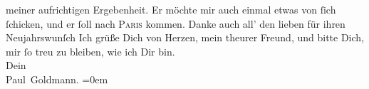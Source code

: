 \begin{ledgroupsized}[t]{13cm}
               meiner aufrichtigen Ergebenheit. Er möchte mir auch einmal etwas {\pb}von ſich ſchicken, und er ſoll nach \textsc{Paris} kommen. Danke auch all’ den lieben \label{K_L02605-2v}\label{K_L02605-2h} für ihren Neujahrswunſch\pend
           \pstart
           Ich grüße Dich von Herzen, mein theurer Freund, und bitte Dich, mir ſo treu zu
               bleiben, wie ich Dir bin. {\\[\baselineskip]}Dein {\\[\baselineskip]}\spacefill\mbox{Paul Goldmann.}\pend
           \leftskip=0em{}
         
         \endnumbering{}\end{ledgroupsized}  \newcommand{\dateiname}{L02605}\newcommand{\titel}{Paul Goldmann an Arthur Schnitzler, 8. 1. [1894]}\newcommand{\editorInnen}{Martin Anton Müller und Laura Untner}
      